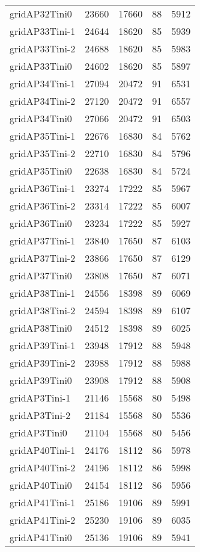 \begin{tabular}{lrrrr}
gridAP32Tini0 & 23660 & 17660 & 88 & 5912 \\
gridAP33Tini-1 & 24644 & 18620 & 85 & 5939 \\
gridAP33Tini-2 & 24688 & 18620 & 85 & 5983 \\
gridAP33Tini0 & 24602 & 18620 & 85 & 5897 \\
gridAP34Tini-1 & 27094 & 20472 & 91 & 6531 \\
gridAP34Tini-2 & 27120 & 20472 & 91 & 6557 \\
gridAP34Tini0 & 27066 & 20472 & 91 & 6503 \\
gridAP35Tini-1 & 22676 & 16830 & 84 & 5762 \\
gridAP35Tini-2 & 22710 & 16830 & 84 & 5796 \\
gridAP35Tini0 & 22638 & 16830 & 84 & 5724 \\
gridAP36Tini-1 & 23274 & 17222 & 85 & 5967 \\
gridAP36Tini-2 & 23314 & 17222 & 85 & 6007 \\
gridAP36Tini0 & 23234 & 17222 & 85 & 5927 \\
gridAP37Tini-1 & 23840 & 17650 & 87 & 6103 \\
gridAP37Tini-2 & 23866 & 17650 & 87 & 6129 \\
gridAP37Tini0 & 23808 & 17650 & 87 & 6071 \\
gridAP38Tini-1 & 24556 & 18398 & 89 & 6069 \\
gridAP38Tini-2 & 24594 & 18398 & 89 & 6107 \\
gridAP38Tini0 & 24512 & 18398 & 89 & 6025 \\
gridAP39Tini-1 & 23948 & 17912 & 88 & 5948 \\
gridAP39Tini-2 & 23988 & 17912 & 88 & 5988 \\
gridAP39Tini0 & 23908 & 17912 & 88 & 5908 \\
gridAP3Tini-1 & 21146 & 15568 & 80 & 5498 \\
gridAP3Tini-2 & 21184 & 15568 & 80 & 5536 \\
gridAP3Tini0 & 21104 & 15568 & 80 & 5456 \\
gridAP40Tini-1 & 24176 & 18112 & 86 & 5978 \\
gridAP40Tini-2 & 24196 & 18112 & 86 & 5998 \\
gridAP40Tini0 & 24154 & 18112 & 86 & 5956 \\
gridAP41Tini-1 & 25186 & 19106 & 89 & 5991 \\
gridAP41Tini-2 & 25230 & 19106 & 89 & 6035 \\
gridAP41Tini0 & 25136 & 19106 & 89 & 5941 \\

\end{tabular}
